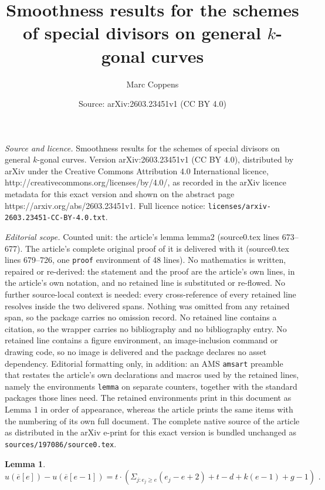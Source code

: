 \documentclass[10pt,a4paper]{amsart}
\title{Smoothness results for the schemes of special divisors on general $k$-gonal curves}
\author{Marc Coppens}
\date{Source: arXiv:2603.23451v1 (CC BY 4.0)}
\newtheorem{lemma}{Lemma}
\begin{document}
\maketitle

\noindent\emph{Source and licence.} Smoothness results for the schemes of special divisors on general $k$-gonal curves. Version arXiv:2603.23451v1 (CC BY 4.0), distributed by arXiv under the Creative Commons Attribution 4.0 International licence, http://creativecommons.org/licenses/by/4.0/, as recorded in the arXiv licence metadata for this exact version and shown on the abstract page https://arxiv.org/abs/2603.23451v1. Full licence notice: \texttt{licenses/arxiv-2603.23451-CC-BY-4.0.txt}.\par\smallskip

\noindent\textit{Editorial scope.} Counted unit: the article's lemma lemma2 (source0.tex lines 673--677). The article's complete original proof of it is delivered with it (source0.tex lines 679--726, one \texttt{proof} environment of 48 lines). No mathematics is written, repaired or re-derived: the statement and the proof are the article's own lines, in the article's own notation, and no retained line is substituted or re-flowed.  No further source-local context is needed: every cross-reference of every retained line resolves inside the two delivered spans.  Nothing was omitted from any retained span, so the package carries no omission record.  No retained line contains a citation, so the wrapper carries no bibliography and no bibliography entry.  No retained line contains a figure environment, an image-inclusion command or drawing code, so no image is delivered and the package declares no asset dependency.  Editorial formatting only, in addition: an AMS \texttt{amsart} preamble that restates the article's own declarations and macros used by the retained lines, namely the environments \texttt{lemma} on separate counters, together with the standard packages those lines need.  The retained environments print in this document as Lemma 1 in order of appearance, whereas the article prints the same items with the numbering of its own full document.  The complete native source of the article as distributed in the arXiv e-print for this exact version is bundled unchanged as \texttt{sources/197086/source0.tex}.
\begin{lemma}\label{lemma2}
\[
u(\overline {e}[e])-u(\overline {e}[e-1])=t \cdot (\Sigma _{j : e_j \geq e}(e_j-e+2)+t-d+k(e-1)+g-1) \text { .}
\]
\end{lemma}
\end{document}
